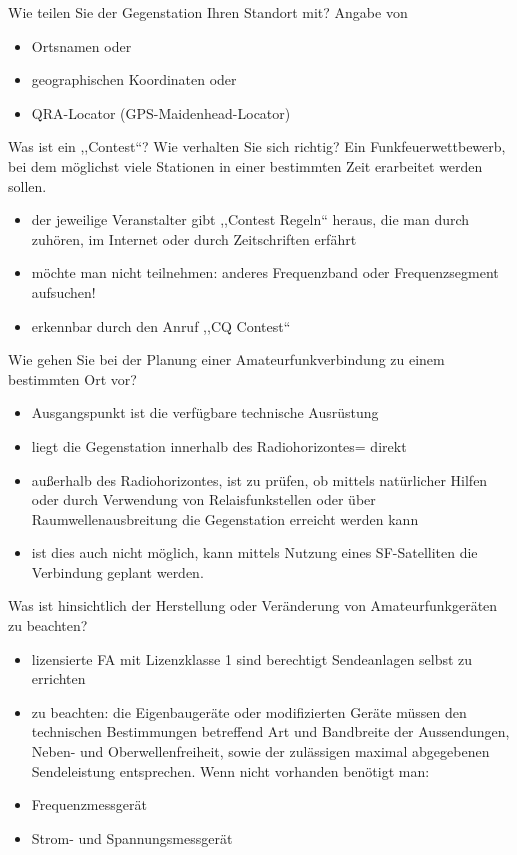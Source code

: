 \documentclass[avery5371,grid,frame,a4paper]{flashcards}
\newcommand{\card}[3]{
  \begin{flashcard}[{\chap} -- #1]{#2}#3\end{flashcard}
}
\begin{document}
\card{70}{Wie teilen Sie der Gegenstation Ihren Standort mit?}{
  Angabe von
  \begin{itemize}
    \item Ortsnamen oder
    \item geographischen Koordinaten oder
    \item QRA-Locator (GPS-Maidenhead-Locator)
  \end{itemize}
}
\card{71}{Was ist ein ,,Contest``? Wie verhalten Sie sich richtig?}{
  \small
  Ein Funkfeuerwettbewerb, bei dem möglichst viele Stationen in einer bestimmten Zeit erarbeitet werden sollen.
  \begin{itemize}
    \item der jeweilige Veranstalter gibt ,,Contest Regeln`` heraus, die man durch zuhören, im Internet oder durch Zeitschriften erfährt
    \item möchte man nicht teilnehmen: anderes Frequenzband oder Frequenzsegment aufsuchen!
    \item erkennbar durch den Anruf ,,CQ Contest``
  \end{itemize}
}
\card{72}{Wie gehen Sie bei der Planung einer Amateurfunkverbindung zu einem bestimmten Ort vor?}{
  \small
  \begin{itemize}
    \item Ausgangspunkt ist die verfügbare technische Ausrüstung
    \item liegt die Gegenstation innerhalb des Radiohorizontes= direkt
    \item außerhalb des Radiohorizontes, ist zu prüfen, ob mittels natürlicher Hilfen oder durch Verwendung von Relaisfunkstellen oder über Raumwellenausbreitung die Gegenstation erreicht werden kann
    \item ist dies auch nicht möglich, kann mittels Nutzung eines SF-Satelliten die Verbindung geplant werden.
  \end{itemize}
}
\card{73}{Was ist hinsichtlich der Herstellung oder Veränderung von Amateurfunkgeräten zu beachten?}{
  \small
  \begin{itemize}
    \item lizensierte FA mit Lizenzklasse 1 sind berechtigt Sendeanlagen selbst zu errichten
    \item zu beachten: die Eigenbaugeräte oder modifizierten Geräte müssen den technischen Bestimmungen betreffend Art und Bandbreite der Aussendungen, Neben- und Oberwellenfreiheit, sowie der zulässigen maximal abgegebenen Sendeleistung entsprechen.  Wenn nicht vorhanden benötigt man:
    \item Frequenzmessgerät
    \item Strom- und Spannungsmessgerät
  \end{itemize}
}
\end{document}
